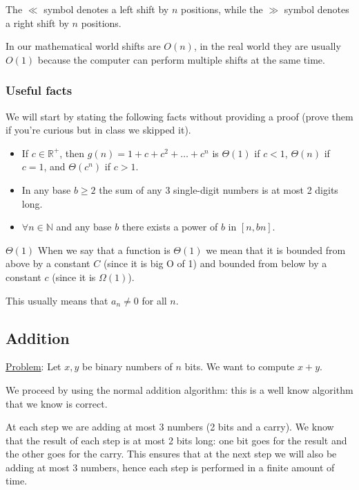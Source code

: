 \documentclass[12pt]{extarticle}
\newcommand{\R}{\mathbb{R}}
\newcommand{\N}{\mathbb{N}}
\begin{document}
The $\ll$ symbol denotes a left shift by $n$ positions, while the $\gg$ symbol denotes a right shift by $n$ positions.

In our mathematical world shifts are $O(n)$, in the real world they are usually $O(1)$ because the computer can perform multiple shifts at the same time.

\subsubsection{Useful facts}

We will start by stating the following facts without providing a proof (prove them if you're curious but in class we skipped it).

\begin{itemize}
    \item If $c \in \R^+$, then $g(n) = 1 + c + c^2 + \dots + c^n$ is $\Theta(1)$ if $c < 1$, $\Theta(n)$ if $c = 1$, and $\Theta(c^n)$ if $c > 1$.
    \item In any base $b \ge 2$ the sum of any 3 single-digit numbers is at most 2 digits long.
    \item $\forall n \in \N$ and any base $b$ there exists a power of $b$ in $[n, bn].$
\end{itemize}

\begin{notebox}{$\Theta(1)$}
    When we say that a function is $\Theta(1)$ we mean that it is bounded from above by a constant $C$ (since it is big O of 1)
    and bounded from below by a constant $c$ (since it is $\Omega(1)$).

    This usually means that $a_n \ne 0$ for all $n$.
\end{notebox}

\subsection{Addition}

\underline{Problem}: Let $x, y$ be binary numbers of $n$ bits. We want to compute $x + y$.

We proceed by using the normal addition algorithm: this is a well know algorithm that we know is correct.

At each step we are adding at most 3 numbers (2 bits and a carry).
We know that the result of each step is at most 2 bits long: one bit goes for the result and the other goes for the carry.
This ensures that at the next step we will also be adding at most 3 numbers, hence each step is performed in a finite amount of time.
\end{document}
